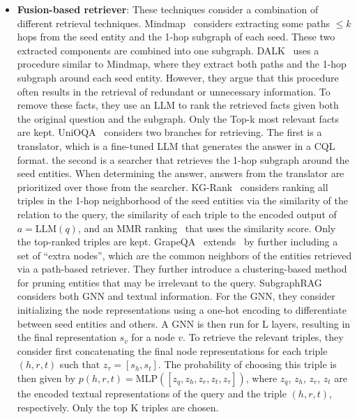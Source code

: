 \begin{itemize}[leftmargin=*]
    \item {\bf Fusion-based retriever}: These techniques consider a combination of different retrieval techniques. Mindmap~\cite{wen2023mindmap} considers extracting some paths $\leq k$ hops from the seed entity and the 1-hop subgraph of each seed. These two extracted components are combined into one subgraph. DALK~\cite{dalk}
    uses a procedure similar to Mindmap, where they extract both paths and the 1-hop subgraph around each seed entity. However, they argue that this procedure often results in the retrieval of redundant or unnecessary information. To remove these facts, they use an LLM to rank the retrieved facts given both the original question and the subgraph. Only the Top-k most relevant facts are kept.
    UniOQA~\cite{unioqa} considers two branches for retrieving. The first is a translator, which is a fine-tuned LLM that generates the answer in a CQL format. the second is a searcher that retrieves the 1-hop subgraph around the seed entities. When determining the answer, answers from the translator are prioritized over those from the searcher. KG-Rank~\cite{kgrank} considers ranking all triples in the 1-hop neighborhood of the seed entities via the similarity of the relation to the query, the similarity of each triple to the encoded output of $a = \text{LLM}(q)$, and an MMR ranking~\cite{carbonell1998use} that uses the similarity score. Only the top-ranked triples are kept. GrapeQA~\cite{taunk2023grapeqa} extends~\cite{yasunaga2021qa} by further including a set of ``extra nodes'', which are the common neighbors of the entities retrieved via a path-based retriever. They further introduce a clustering-based method for pruning entities that may be irrelevant to the query. SubgraphRAG~\cite{li2024simple} considers both GNN and textual information. For the GNN, they consider initializing the node representations using a one-hot encoding to differentiate between seed entities and others. A GNN is then run for L layers, resulting in the final representation $s_v$ for a node $v$. To retrieve the relevant triples, they consider first concatenating the final node representations for each triple $(h, r, t)$ such that $z_{\tau} = [s_h, s_t]$. The probability of choosing this triple is then given by  $p(h, r, t) = \text{MLP}([z_q, z_h, z_r, z_t, z_{\tau}])$, where $z_q$, $z_h$, $z_r$, $z_t$ are the encoded textual representations of the query and the triple $(h, r, t)$, respectively. Only the top K triples are chosen.
    

\end{itemize}
